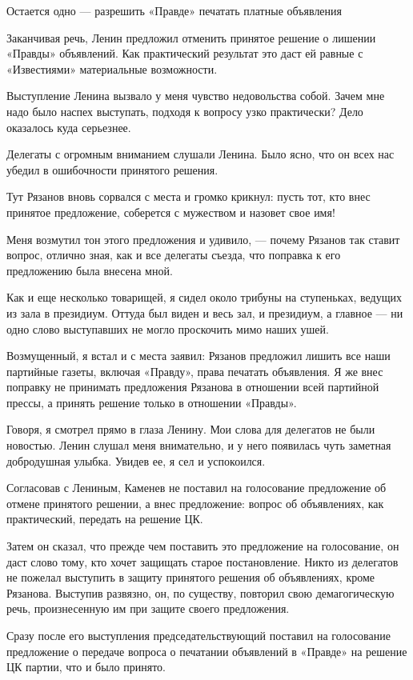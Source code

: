 \documentclass[12pt, a4paper, openany]{book}
\begin{document}
Остается одно — разрешить «Правде» печатать платные объявления

Заканчивая речь, Ленин предложил отменить принятое решение о лишении «Правды» объявлений. Как практический результат это даст ей равные с «Известиями» материальные возможности.

Выступление Ленина вызвало у меня чувство недовольства собой. Зачем мне надо было наспех выступать, подходя к вопросу узко практически? Дело оказалось куда серьезнее.

Делегаты с огромным вниманием слушали Ленина. Было ясно, что он всех нас убедил в ошибочности принятого решения.

Тут Рязанов вновь сорвался с места и громко крикнул: пусть тот, кто внес принятое предложение, соберется с мужеством и назовет свое имя!

Меня возмутил тон этого предложения и удивило, — почему Рязанов так ставит вопрос, отлично зная, как и все делегаты съезда, что поправка к его предложению была внесена мной.

Как и еще несколько товарищей, я сидел около трибуны на ступеньках, ведущих из зала в президиум. Оттуда был виден и весь зал, и президиум, а главное — ни одно слово выступавших не могло проскочить мимо наших ушей.

Возмущенный, я встал и с места заявил: Рязанов предложил лишить все наши партийные газеты, включая «Правду», права печатать объявления. Я же внес поправку не принимать предложения Рязанова в отношении всей партийной прессы, а принять решение только в отношении «Правды».

Говоря, я смотрел прямо в глаза Ленину. Мои слова для делегатов не были новостью. Ленин слушал меня внимательно, и у него появилась чуть заметная добродушная улыбка. Увидев ее, я сел и успокоился.

Согласовав с Лениным, Каменев не поставил на голосование предложение об отмене принятого решении, а внес предложение: вопрос об объявлениях, как практический, передать на решение ЦК.

Затем он сказал, что прежде чем поставить это предложение на голосование, он даст слово тому, кто хочет защищать старое постановление. Никто из делегатов не пожелал выступить в защиту принятого решения об объявлениях, кроме Рязанова. Выступив развязно, он, по существу, повторил свою демагогическую речь, произнесенную им при защите своего предложения.

Сразу после его выступления председательствующий поставил на голосование предложение о передаче вопроса о печатании объявлений в «Правде» на решение ЦК партии, что и было принято.
\end{document}
